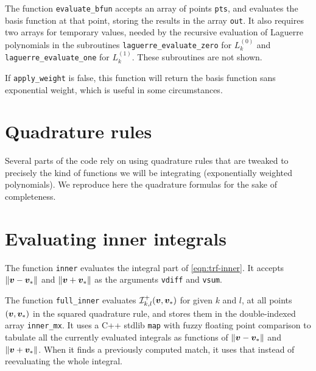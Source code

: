The function {\tt evaluate\_bfun} accepts an array of points {\tt pts}, and evaluates the basis function at
that point, storing the results in the array {\tt out}. It also requires two arrays for temporary values,
needed by the recursive evaluation of Laguerre polynomials in the subroutines {\tt laguerre\_evaluate\_zero}
for $L_k^{(0)}$ and {\tt laguerre\_evaluate\_one} for $L_k^{(1)}$. These subroutines are not shown.

If {\tt apply\_weight} is false, this function will return the basis function sans exponential weight, which
is useful in some circumstances.



\section{Quadrature rules}

Several parts of the code rely on using quadrature rules that are tweaked to precisely the kind of functions
we will be integrating (exponentially weighted polynomials). We reproduce here the quadrature formulas for
the sake of completeness.



\section{Evaluating inner integrals}

The function {\tt inner} evaluates the integral part of \eqref{eqn:trf-inner}. It accepts $\|{\bm v}-{\bm v}_\ast\|$
and $\|{\bm v}+{\bm v}_\ast\|$ as the arguments {\tt vdiff} and {\tt vsum}.



The function {\tt full\_inner} evaluates $\mathcal{I}^+_{k,l}({\bm v},{\bm v}_\ast)$ for given $k$ and $l$, at all points
$({\bm v},{\bm v}_\ast)$ in the squared quadrature rule, and stores them in the double-indexed array {\tt inner\_mx}.
It uses a C++ stdlib {\tt map} with fuzzy floating point comparison to tabulate all the currently evaluated
integrals as functions of $\|{\bm v}-{\bm v}_\ast\|$ and $\|{\bm v}+{\bm v}_\ast\|$. When it finds a previously computed
match, it uses that instead of reevaluating the whole integral.



